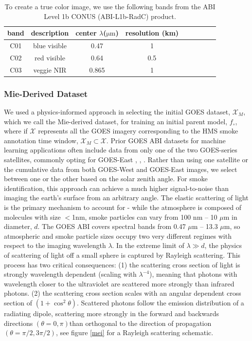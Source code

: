 \begin{table}
    \caption{To create a true color image, we use the following bands from the ABI Level 1b CONUS (ABI-L1b-RadC) product.}\label{rgb_bands}
    \centering
        \begin{tabular}{ccccrrcrc}
            \toprule
            band & description & center \(\lambda\)($\mathrm{\mu m}$) & resolution (km)\\
            \midrule
            C01 &  blue visible & 0.47 & 1 \\
            C02 & red visible & 0.64 & 0.5 \\
            C03 & veggie NIR & 0.865 & 1 \\
            \bottomrule
        \end{tabular}
\end{table}


\subsubsection{Mie-Derived Dataset}

We used a physics-informed approach in selecting the initial GOES dataset, \(\mathcal{X}_M\), which we call the Mie-derived dataset, for training an initial parent model, \(f_{\circ}\), where if \(\mathcal{X}\) represents all the GOES imagery corresponding to the HMS smoke annotation time window, \(\mathcal{X}_M \subset \mathcal{X}\). Prior GOES ABI datasets for machine learning applications often include data from only one of the two GOES-series satellites, commonly opting for GOES-East \cite{smoke_goes}, \cite{wildfire_detect}, \cite{goes_conv}. Rather than using one satellite or the cumulative data from both GOES-West and GOES-East images, we select between one or the other based on the solar zenith angle. For smoke identification, this approach can achieve a much higher signal-to-noise than imaging the earth’s surface from an arbitrary angle. The elastic scattering of light is the primary mechanism to account for - while the atmosphere is composed of molecules with size \(<\)1nm, smoke particles can vary from 100 nm -- 10 \(\mu\)m in diameter, \(d\). The GOES ABI covers spectral bands from 0.47 \(\mu\)m -- 13.3 \(\mu\)m, so atmospheric and smoke particle sizes occupy two very different regimes with respect to the imaging wavelength \(\lambda\). In the extreme limit of \(\lambda \gg d\), the physics of scattering of light off a small sphere is captured by Rayleigh scattering. This process has two critical consequences: (1) the scattering cross section of light is strongly wavelength dependent (scaling with \(\lambda^{-4}\)), meaning that photons with wavelength closer to the ultraviolet are scattered more strongly than infrared photons. (2) the scattering cross section scales with an angular dependent cross section of \((1 + \cos^2 \theta)\). Scattered photons follow the emission distribution of a radiating dipole, scattering more strongly in the forward and backwards directions \((\theta = 0,\pi)\)than orthogonal to the direction of propagation \((\theta = \pi/2, 3\pi/2)\), see figure \ref{mei} for a Rayleigh scattering schematic.


